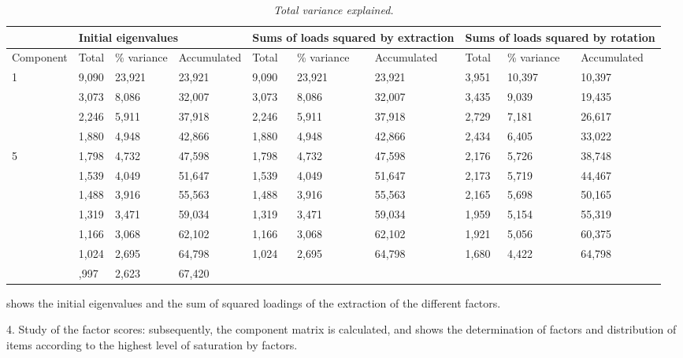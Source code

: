 \documentclass[english]{textolivre}
\begin{document}
\begingroup
\setlength\tabcolsep{2pt} %
\small
\begin{table}[h!]
\centering
\caption{\textit{Total variance explained.}}
\begin{tabular}{*{10}{p{}}}
\toprule
&
\multicolumn{3}{p{0.27\textwidth}}{Initial eigenvalues}	& 
\multicolumn{3}{p{0.27\textwidth}}{Sums of loads squared by extraction} & \multicolumn{3}{p{0.27\textwidth}}{Sums of loads squared by rotation} \\
\midrule
Compo\-nent & Total & \% variance & Accumu\-lated & Total & \% variance & Accumu\-lated & Total & \% variance & Accumu\-lated \\
\midrule
1 & 9,090 & 23,921 & 23,921 & 9,090 & 23,921 & 23,921 & 3,951 & 10,397 & 10,397 \\
& 3,073 & 8,086 & 32,007 & 3,073 & 8,086 & 32,007 & 3,435 & 9,039 & 19,435 \\
& 2,246 & 5,911 & 37,918 & 2,246 & 5,911 & 37,918 & 2,729 & 7,181 & 26,617 \\
& 1,880 & 4,948 & 42,866 & 1,880 & 4,948 & 42,866 & 2,434 & 6,405 & 33,022 \\
5 & 1,798 & 4,732 & 47,598 & 1,798 & 4,732 & 47,598 & 2,176 & 5,726 & 38,748 \\
& 1,539 & 4,049 & 51,647 & 1,539 & 4,049 & 51,647 & 2,173 & 5,719 & 44,467 \\
& 1,488 & 3,916 & 55,563 & 1,488 & 3,916 & 55,563 & 2,165 & 5,698 & 50,165 \\
& 1,319 & 3,471 & 59,034 & 1,319 & 3,471 & 59,034 & 1,959 & 5,154 & 55,319 \\
& 1,166 & 3,068 & 62,102 & 1,166 & 3,068 & 62,102 & 1,921 & 5,056 & 60,375 \\
& 1,024 & 2,695 & 64,798 & 1,024 & 2,695 & 64,798 & 1,680 & 4,422 & 64,798 \\
& ,997 & 2,623 & 67,420 \\
\bottomrule
\end{tabular}
\label{Table02}
\end{table}
\endgroup

 shows the initial eigenvalues and the sum of squared loadings of the extraction of the different factors.

4. Study of the factor scores: subsequently, the component matrix is calculated, and  shows the determination of factors and distribution of items according to the highest level of saturation by factors.
\end{document}

